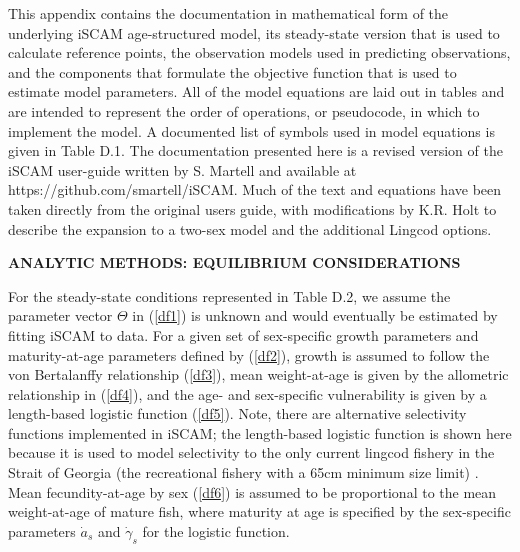 \documentclass[11pt]{article}   %
\def\AppLet{D}                   %
\def\headc{\vspace{-1ex}} %
\def\subsub#1{\noindent {\bf #1} \headc}    %
\newcommand{\eref}[1]{(\ref{#1})}
\begin{document}
This appendix contains the documentation in mathematical form of the underlying iSCAM age-structured model, its steady-state version that is used to calculate reference points, the observation models used in predicting observations, and the components that formulate the objective function that is used to estimate model parameters.  All of the model equations are laid out in tables and are intended to represent the order of operations, or pseudocode, in which to implement the model.  A documented list of symbols used in model equations is given in Table \AppLet.1.  The documentation presented here is a revised version of the iSCAM user-guide written by S. Martell and available at https://github.com/smartell/iSCAM.  Much of the text and equations have been taken directly from the original users guide, with modifications by K.R. Holt to describe the expansion to a two-sex model and the additional Lingcod options.



{ \bf ANALYTIC METHODS: EQUILIBRIUM CONSIDERATIONS}

\subsub{A Steady-State Age-Structured Model}

For the steady-state conditions represented in Table \AppLet.2, we assume the parameter vector $\Theta$ in \eref{df1} is unknown and would eventually be estimated by fitting iSCAM to data.  For a given set of sex-specific growth parameters and maturity-at-age parameters defined by \eref{df2}, growth is assumed to follow the von Bertalanffy relationship \eref{df3}, mean weight-at-age is given by the allometric relationship in \eref{df4}, and the age- and sex-specific vulnerability is given by a length-based logistic function \eref{df5}.  Note, there are alternative selectivity functions implemented in iSCAM; the length-based logistic function is shown here because it is used to model selectivity to the only current lingcod fishery in the Strait of Georgia (the recreational fishery with a 65cm minimum size limit) .  Mean fecundity-at-age by sex \eref{df6} is assumed to be proportional to the mean weight-at-age of mature fish, where maturity at age is specified by the sex-specific parameters $\dot{a}_s$ and $\dot{\gamma}_s$ for the logistic function.

\clearpage



\end{document}
